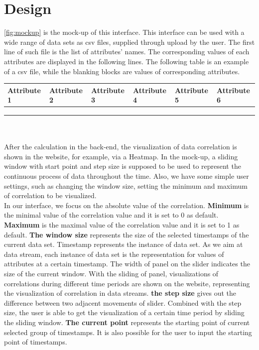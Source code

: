 \section{Design}
\label{sec:Interface:Design}
\autoref{fig:mockup} is the mock-up of this interface. This interface can be used with a wide range of data sets as csv files, supplied through upload by the user. The first line of such file is the list of attributes' names. The corresponding values of each attributes are displayed in the following lines. The following table is an example of a csv file, while the blanking blocks are values of corresponding attributes.\\
	\begin{tabular}{ | l | l | l | l | l | l |}
		\hline
		Attribute 1 & Attribute 2 & Attribute 3 & Attribute 4 & Attribute 5 & Attribute 6 \\ \hline
		            &             &             &             &             &             \\ \hline
		            &             &             &             &             &             \\ \hline
		            &             &             &             &             &             \\ \hline
	\end{tabular}
\\\\After the calculation in the back-end, the visualization of data correlation is shown in the website, for example, via a Heatmap. In the mock-up, a sliding window with start point and step size is supposed to be used to represent the continuous process of data throughout the time. Also, we have some simple user settings, such as changing the window size, setting the minimum and maximum of correlation to be visualized.\\
In our interface, we focus on the absolute value of the correlation. \textbf{Minimum} is the minimal value of the correlation value and it is set to 0 as default. \textbf{Maximum} is the maximal value of the correlation value and it is set to 1 as default. \textbf{The window size} represents the size of the selected timestamps of the current data set. Timestamp represents the instance of data set. As we aim at data stream, each instance of data set is the representation for values of attributes at a certain timestamp. The width of panel on the slider indicates the size of the current window. With the sliding of panel, visualizations of correlations during different time periods are shown on the website, representing the visualization of correlation in data streams. \textbf{the step size} gives out the difference between two adjacent movements of slider. Combined with the step size, the user is able to get the visualization of a certain time period by sliding the sliding window. \textbf{The current point} represents the starting point of current selected group of timestamps. It is also possible for the user to input the starting point of timestamps.\\

